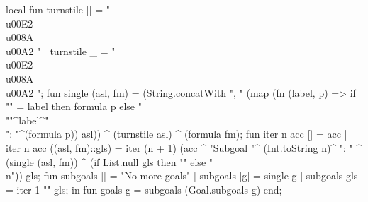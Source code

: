 \nwenddocs{}\endmoddef\nwstartdeflinemarkup{}\nwenddeflinemarkup
local
  fun turnstile [] = "\\u00E2\\u008A\\u00A2 "
    | turnstile _ = " \\u00E2\\u008A\\u00A2 ";
  fun single (asl, fm) =
    (String.concatWith
       ", "
       (map (fn (label, p) =>
                if "" = label then formula p
                else "\\""^label^"\\": "^(formula p))
            asl)) ^
    (turnstile asl) ^ 
    (formula fm);
  fun iter n acc [] = acc
    | iter n acc ((asl, fm)::gls) =
        iter (n + 1)
             (acc ^
              "Subgoal "^
              (Int.toString n)^
              ": " ^
              (single (asl, fm)) ^
              (if List.null gls then "" else "\\n"))
             gls;
  fun subgoals [] = "No more goals"
    | subgoals [g] = single g
    | subgoals gls = iter 1 "" gls; 
in
fun goals g = subgoals (Goal.subgoals g)
end;
\eatline
{}\nwendcode{}

